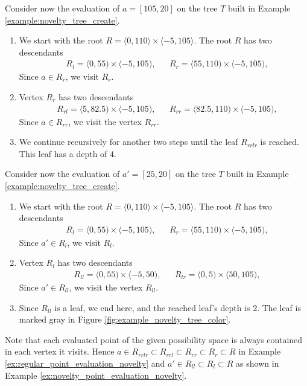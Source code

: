 \begin{example}
\label{ex:regular_point_evaluation_novelty}
    Consider now the evaluation of $a = [105,20]$ on the tree $T$ built in Example \ref{example:novelty_tree_create}.

\begin{enumerate}
    \item  We start with the root $R = \langle 0,110\rangle \times \langle -5, 105 \rangle$.
    The root $R$ has two descendants 
\begin{align*}
    &R_l = \langle 0,55) \times \langle -5, 105),&
    &R_r = \langle 55,110) \times \langle -5, 105),
\end{align*}
Since $a \in R_r$, we visit $R_r$.
\item Vertex $R_r$ has two descendants
\begin{align*}
    &R_{rl} = \langle 5,82.5) \times \langle -5, 105),&
    &R_{rr} = \langle 82.5,110) \times \langle -5, 105),
\end{align*}
Since $a \in R_{rr}$, we visit the vertex $R_{rr}$.
\item
We continue recursively for another two steps until the leaf $R_{rrlr}$ is reached. This leaf has a depth of $4$.

\end{enumerate}
   
\end{example}

\begin{example}
\label{ex:novelty_point_evaluation_novelty}
    Consider now the evaluation of $a' = [25,20]$ on the tree $T$ built in Example \ref{example:novelty_tree_create}.

\begin{enumerate}
    \item  We start with the root $R = \langle 0,110\rangle \times \langle -5, 105 \rangle$.
    The root $R$ has two descendants 
\begin{align*}
    &R_l = \langle 0,55) \times \langle -5, 105),&
    &R_r = \langle 55,110) \times \langle -5, 105),
\end{align*}
Since $a' \in R_l$, we visit $R_l$.
\item Vertex $R_l$ has two descendants
\begin{align*}
    &R_{ll} = \langle 0,55) \times \langle -5, 50),&
    &R_{lr} = \langle 0,5) \times \langle 50, 105),
\end{align*}
Since $a' \in R_{ll}$, we visit the vertex $R_{ll}$.
\item
Since $R_{ll}$ is a leaf, we end here, and the reached leaf's depth is $2$. The leaf is marked gray in Figure \ref{fig:example_novelty_tree_color}.
\end{enumerate}
\end{example}
Note that each evaluated point of the given possibility space is always contained in each vertex it visits.
Hence $a \in R_{rrlr} \subset R_{rrl} \subset R_{rr} \subset R_{r} \subset R$ in Example \ref{ex:regular_point_evaluation_novelty}
and $a' \in R_{ll} \subset R_{l} \subset R$ as shown in Example \ref{ex:novelty_point_evaluation_novelty}.



